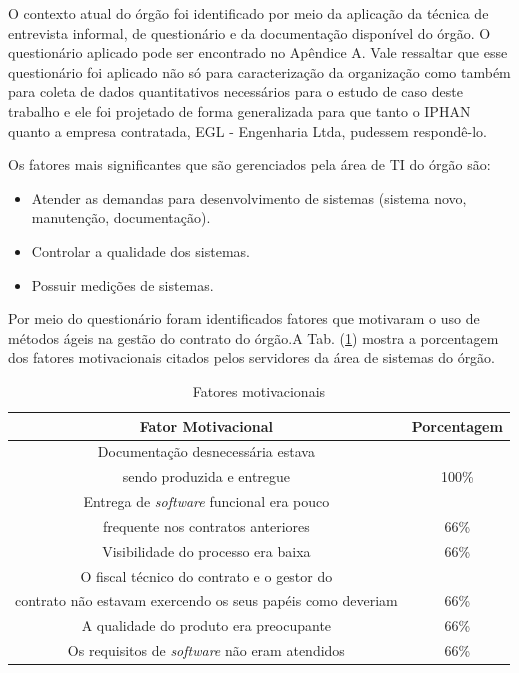 O contexto atual do órgão foi identificado por meio da aplicação da técnica de entrevista informal, de questionário e da documentação disponível do órgão. O questionário aplicado pode ser encontrado no Apêndice A. Vale ressaltar que esse questionário foi aplicado não só para caracterização da organização como também para coleta de dados quantitativos necessários para o estudo de caso deste trabalho e ele foi projetado de forma generalizada para que tanto o IPHAN quanto a empresa contratada, EGL - Engenharia Ltda, pudessem respondê-lo.
 
Os fatores mais significantes que são gerenciados pela área de TI do órgão são:
\begin{itemize}
\item Atender as demandas para desenvolvimento de sistemas (sistema novo, manutenção, documentação).
\item Controlar a qualidade dos sistemas.
\item Possuir medições de sistemas.
\end{itemize}

Por meio do questionário foram identificados fatores que motivaram o uso de métodos ágeis na gestão do contrato do órgão.A Tab. (\ref{fm}) mostra a porcentagem dos fatores motivacionais citados pelos servidores da área de sistemas do órgão. 

\begin{table}[H]
\center
\footnotesize
\begin{tabular}{|c|c|}
\hline
\textbf{Fator Motivacional}          & \textbf{Porcentagem}  \\ \hline
Documentação desnecessária estava \\ sendo produzida e entregue               &  100\%                 \\ \hline
Entrega de \textit{software} funcional era pouco \\ frequente nos contratos anteriores        &  66\%                  \\ \hline
Visibilidade do processo era baixa              &  66\%                \\ \hline
O fiscal técnico do contrato e o gestor do \\ contrato não estavam exercendo os seus papéis como deveriam              &  66\%                \\ \hline
A qualidade do produto era preocupante   &  66\%                \\ \hline
Os requisitos de \textit{software} não eram atendidos &  66\%                \\ \hline
\end{tabular}
\caption{Fatores motivacionais}
\label{fm}
\end{table}

